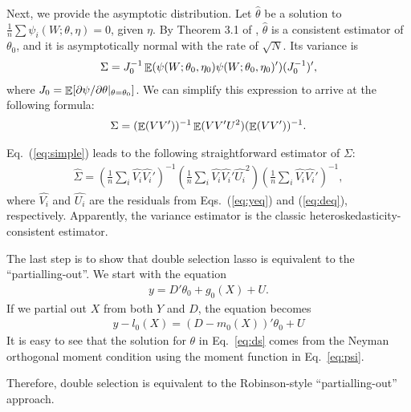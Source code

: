 \documentclass[11pt]{article}
\begin{document}

Next, we provide the asymptotic distribution.  Let $\widehat{\theta}$ be a solution to $\frac{1}{n}\sum \psi_i(W; \theta, \eta) =0$,
given $\eta$. By Theorem 3.1 of \cite{cherno/etal:18},  $\widehat{\theta}$ is
a consistent estimator of $\theta_0$, and it is asymptotically normal with the rate of $\sqrt{N}$. Its variance is 
\begin{align}
\Sigma = J_0^{-1} \mathop{\mathbb{E}} (\psi(W; \theta_0, \eta_0) \psi(W; \theta_0, \eta_0)')
(J_0^{-1})', \label{eq:var}
\end{align}
where $J_0 = \mathop{\mathbb{E}}[ \partial \psi / \partial \theta |_{\theta = \theta_0}]$. We can simplify this expression to arrive at the following formula:
\begin{align}
\Sigma = (\mathop{\mathbb{E}} (VV') )^{-1} \mathop{\mathbb{E}}(VV'U^2) (\mathop{\mathbb{E}}(VV'))^{-1}.\label{eq:simple}
\end{align}

Eq.~(\ref{eq:simple}) leads to the following straightforward  estimator of $\Sigma$:
\begin{align}
\widehat{\Sigma} = 
\left(\frac{1}{n} \sum_i \widehat{V_i}\widehat{V_i}'\right)^{-1}
\left(
\frac{1}{n} \sum_i \widehat{V_i}\widehat{V_i}'\widehat{U_i}^2
\right)
\left(\frac{1}{n} \sum_i \widehat{V_i}\widehat{V_i}'\right)^{-1},
\label{eq:varhat}
\end{align}
where $\widehat{V_i}$ and $\widehat{U_i}$ are the residuals from Eqs.~(\ref{eq:yeq}) and (\ref{eq:deq}), respectively. 
Apparently, the variance estimator is the classic
heteroskedasticity-consistent estimator.

The last step is to show that double selection lasso is equivalent to the ``partialling-out''. We start with the equation 
\begin{align*}
	y = D'\theta_0 + g_0(X) + U.
\end{align*}
If we partial out $X$ from both $Y$ and $D$, the equation becomes
\begin{align}
y - l_0(X) = (D - m_0(X))'\theta_0 + U
\label{eq:ds}
\end{align}
It is easy to see that the solution for $\theta$ in Eq.~\ref{eq:ds} comes from the
Neyman orthogonal moment condition using the moment function in Eq.~\ref{eq:psi}. 

Therefore, double selection is equivalent to the Robinson-style
``partialling-out'' approach.
\end{document}

